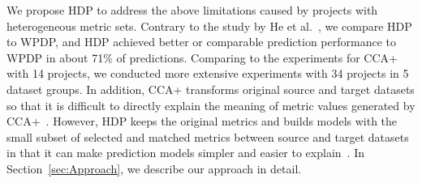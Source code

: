 We propose HDP to address the above
limitations caused by projects with heterogeneous metric sets.
Contrary to the study by He et al.~\cite{He14}, we compare HDP to
WPDP, and HDP achieved better or comparable prediction performance to WPDP in
about 71\% of predictions.
Comparing to the experiments for CCA+~\cite{Jing15} with 14 projects, we conducted more extensive experiments with 34 projects in 5 dataset groups. In addition, CCA+ transforms original source and target datasets so that it is difficult to directly explain the meaning of metric values generated by CCA+~\cite{Jing15}. However, HDP keeps the original metrics and builds models with the small subset of selected and matched metrics between source and target datasets in that it can make prediction models simpler and easier to explain~\cite{Nam15HDP,Shihab14}. In
Section~\ref{sec:Approach}, we describe our approach in detail.

